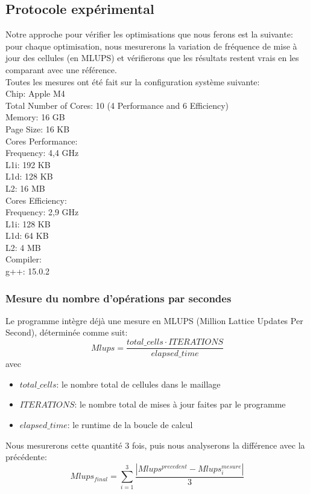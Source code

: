 \subsection{Protocole expérimental}

Notre approche pour vérifier les optimisations que nous ferons est la suivante: pour chaque optimisation, nous mesurerons la variation de fréquence de mise à jour des cellules (en MLUPS) et vérifierons que les résultats restent vrais en les comparant avec une référence.\\

Toutes les mesures ont été fait sur la configuration système suivante:\\
Chip: Apple M4\\
Total Number of Cores: 10 (4 Performance and 6 Efficiency)\\
Memory: 16 GB\\
Page Size: 16 KB\\

Cores Performance:\\
Frequency: 4,4 GHz \\
L1i: 192 KB\\
L1d: 128 KB\\
L2: 16 MB\\

Cores Efficiency:\\
Frequency: 2,9 GHz\\
L1i: 128 KB\\
L1d: 64 KB\\
L2: 4 MB\\

Compiler:\\
g++: 15.0.2\\



\subsubsection{Mesure du nombre d'opérations par secondes}

Le programme intègre déjà une mesure en MLUPS (Million Lattice Updates Per Second), déterminée comme suit:
$$ Mlups = \frac{total\_cells \cdot ITERATIONS}{elapsed\_time} $$
avec
\begin{itemize}
	\item[$\bullet$] $total\_cells$: le nombre total de cellules dans le maillage
	\item[$\bullet$] $ITERATIONS$: le nombre total de mises à jour faites par le programme
	\item[$\bullet$] $elapsed\_time$: le runtime de la boucle de calcul
\end{itemize}
Nous mesurerons cette quantité 3 fois, puis nous analyserons la différence avec la précédente: 
$$ Mlups_{final} = \sum^3_{i=1}\frac{\left|Mlups^{precedent} - Mlups^{mesure}_i \right|}{3} $$

